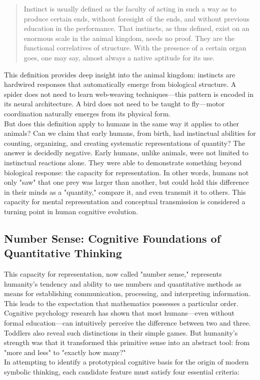 \begin{quote}
	Instinct is usually defined as the faculty of acting in such a way as to produce certain ends, without foresight of the ends, and without previous education in the performance. That instincts, as thus defined, exist on an enormous scale in the animal kingdom, needs no proof. They are the functional correlatives of structure. With the presence of a certain organ goes, one may say, almost always a native aptitude for its use.
\end{quote}
This definition provides deep insight into the animal kingdom: instincts are hardwired responses that automatically emerge from biological structure. A spider does not need to learn web-weaving techniques—this pattern is encoded in its neural architecture. A bird does not need to be taught to fly—motor coordination naturally emerges from its physical form.\\
But does this definition apply to humans in the same way it applies to other animals? Can we claim that early humans, from birth, had instinctual abilities for counting, organizing, and creating systematic representations of quantity? The answer is decidedly negative. Early humans, unlike animals, were not limited to instinctual reactions alone. They were able to demonstrate something beyond biological response: the capacity for representation. In other words, humans not only "saw" that one prey was larger than another, but could hold this difference in their minds as a "quantity," compare it, and even transmit it to others. This capacity for mental representation and conceptual transmission is considered a turning point in human cognitive evolution.
\subsection{Number Sense: Cognitive Foundations of Quantitative Thinking}

This capacity for representation, now called "number sense," represents humanity's tendency and ability to use numbers and quantitative methods as means for establishing communication, processing, and interpreting information. This leads to the expectation that mathematics possesses a particular order. Cognitive psychology research has shown that most humans—even without formal education—can intuitively perceive the difference between two and three. Toddlers also reveal such distinctions in their simple games. But humanity's strength was that it transformed this primitive sense into an abstract tool: from "more and less" to "exactly how many?"\\
In attempting to identify a prototypical cognitive basis for the origin of modern symbolic thinking, each candidate feature must satisfy four essential criteria:

